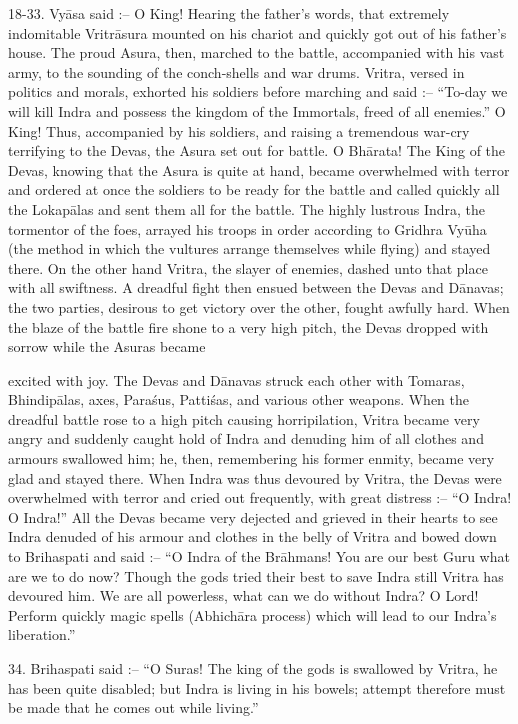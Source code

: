 18-33. Vy\=asa said :-- O King! Hearing the father's words, that extremely indomitable Vritr\=asura mounted on his chariot and quickly got out of his father's house. The proud Asura, then, marched to the battle, accompanied with his vast army, to the sounding of the conch-shells and war drums. Vritra, versed in politics and morals, exhorted his soldiers before marching and said :-- ``To-day we will kill Indra and possess the kingdom of the Immortals, freed of all enemies.'' O King! Thus, accompanied by his soldiers, and raising a tremendous war-cry terrifying to the Devas, the Asura set out for battle. O Bh\=arata! The King of the Devas, knowing that the Asura is quite at hand, became overwhelmed with terror and ordered at once the soldiers to be ready for the battle and called quickly all the Lokap\=alas and sent them all for the battle. The highly lustrous Indra, the tormentor of the foes, arrayed his troops in order according to Gridhra Vy\=uha (the method in which the vultures arrange themselves while flying) and stayed there. On the other hand Vritra, the slayer of enemies, dashed unto that place with all swiftness. A dreadful fight then ensued between the Devas and D\=anavas; the two parties, desirous to get victory over the other, fought awfully hard. When the blaze of the battle fire shone to a very high pitch, the Devas dropped with sorrow while the Asuras became

excited with joy. The Devas and D\=anavas struck each other with Tomaras, Bhindip\=alas, axes, Para\'sus, Patti\'sas, and various other weapons. When the dreadful battle rose to a high pitch causing horripilation, Vritra became very angry and suddenly caught hold of Indra and denuding him of all clothes and armours swallowed him; he, then, remembering his former enmity, became very glad and stayed there. When Indra was thus devoured by Vritra, the Devas were overwhelmed with terror and cried out frequently, with great distress :-- ``O Indra! O Indra!'' All the Devas became very dejected and grieved in their hearts to see Indra denuded of his armour and clothes in the belly of Vritra and bowed down to Brihaspati and said :-- ``O Indra of the Br\=ahmans! You are our best Guru what are we to do now? Though the gods tried their best to save Indra still Vritra has devoured him. We are all powerless, what can we do without Indra? O Lord! Perform quickly magic spells (Abhich\=ara process) which will lead to our Indra's liberation.''

34. Brihaspati said :-- ``O Suras! The king of the gods is swallowed by Vritra, he has been quite disabled; but Indra is living in his bowels; attempt therefore must be made that he comes out while living.''

